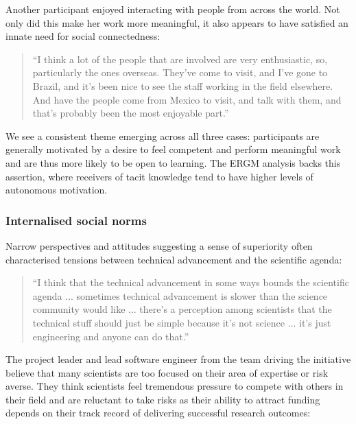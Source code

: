  Another participant enjoyed interacting with people from across the world. Not only did this make her work more meaningful, it also appears to have satisfied an innate need for social connectedness:
 
 \begin{quote}
\small
\enquote{I think a lot of the people that are involved are very enthusiastic, so, particularly the ones overseas. They've come to visit, and I've gone to Brazil, and it's been nice to see the staff working in the field elsewhere. And have the people come from Mexico to visit, and talk with them, and that's probably been the most enjoyable part.} \\
\end{quote}

We see a consistent theme emerging across all three cases: participants are generally motivated by a desire to feel competent and perform meaningful work and are thus more likely to be open to learning. The ERGM analysis backs this assertion, where receivers of tacit knowledge tend to have higher levels of autonomous motivation.

\subsubsection{Internalised social norms}

Narrow perspectives and attitudes suggesting a sense of superiority often characterised tensions between technical advancement and the scientific agenda:

\begin{quote}
\small
\enquote{I think that the technical advancement in some ways bounds the scientific agenda ... sometimes technical advancement is slower than the science community would like ... there's a perception among scientists that the technical stuff should just be simple because it's not science ... it's just engineering and anyone can do that.} \\
\end{quote}

The project leader and lead software engineer from the team driving the initiative believe that many scientists are too focused on their area of expertise or risk averse. They think scientists feel tremendous pressure to compete with others in their field and are reluctant to take risks as their ability to attract funding depends on their track record of delivering successful research outcomes:

